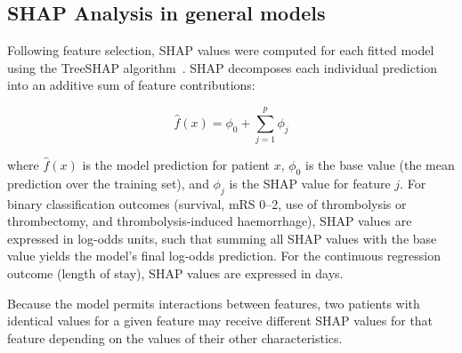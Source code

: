 \subsection{SHAP Analysis in general models}

Following feature selection, SHAP values were computed for each fitted model using the TreeSHAP algorithm~\cite{lundberg2018consistent}. SHAP decomposes each individual
prediction into an additive sum of feature contributions:

\begin{equation}
    \hat{f}(x) = \phi_0 + \sum_{j=1}^{p} \phi_j
\end{equation}

\noindent where $\hat{f}(x)$ is the model prediction for patient $x$, $\phi_0$ is the base value (the mean prediction over the training set), and $\phi_j$ is the SHAP value for feature $j$. For binary classification outcomes (survival, mRS 0--2, use of thrombolysis or thrombectomy, and thrombolysis-induced haemorrhage), SHAP values are expressed in log-odds units, such that summing all SHAP values with the base value yields the model's final log-odds prediction. For the continuous regression outcome (length of stay), SHAP values are expressed in days.

Because the model permits interactions between features, two patients with identical values for a given feature may receive different SHAP values for that feature depending on the values of their other characteristics.